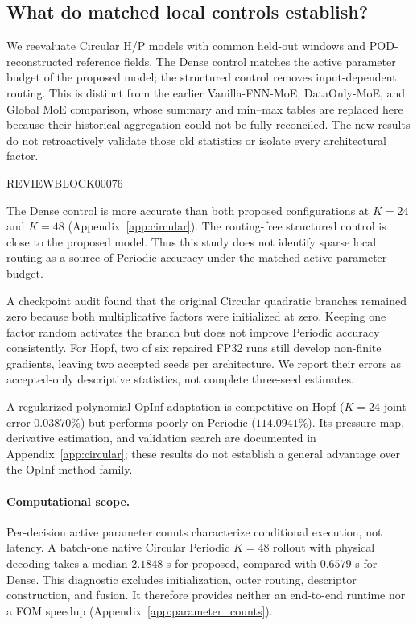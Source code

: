 \documentclass{article}
\begin{document}
\subsection{What do matched local controls establish?}

We reevaluate Circular H/P models with common held-out windows and
POD-reconstructed reference fields. The Dense control matches the active
parameter budget of the proposed model; the structured control removes
input-dependent routing. This is distinct from the earlier
Vanilla-FNN-MoE, DataOnly-MoE, and Global MoE comparison, whose summary and
min--max tables are replaced here because their historical aggregation
could not be fully reconciled. The new results do not retroactively
validate those old statistics or isolate every architectural factor.



REVIEWBLOCK00076



The Dense control is more accurate than both proposed configurations at
$K=24$ and $K=48$ (Appendix~\ref{app:circular}). The routing-free
structured control is close to the proposed model. Thus this study does
not identify sparse local routing as a source of Periodic accuracy under
the matched active-parameter budget.

A checkpoint audit found that the original Circular quadratic branches
remained zero because both multiplicative factors were initialized at
zero. Keeping one factor random activates the branch but does not improve
Periodic accuracy consistently. For Hopf, two of six repaired FP32 runs
still develop non-finite gradients, leaving two accepted seeds per
architecture. We report their errors as accepted-only descriptive
statistics, not complete three-seed estimates.

A regularized polynomial OpInf adaptation is competitive on Hopf
($K=24$ joint error $0.03870\%$) but performs poorly on Periodic
($114.0941\%$). Its pressure map, derivative estimation, and validation
search are documented in Appendix~\ref{app:circular}; these results do
not establish a general advantage over the OpInf method family.

\paragraph{Computational scope.}
Per-decision active parameter counts characterize conditional execution,
not latency. A batch-one native Circular Periodic $K=48$ rollout with
physical decoding takes a median $2.1848$ s for proposed, compared with
$0.6579$ s for Dense. This diagnostic excludes initialization, outer
routing, descriptor construction, and fusion. It therefore provides
neither an end-to-end runtime nor a FOM speedup
(Appendix~\ref{app:parameter_counts}).
\end{document}
